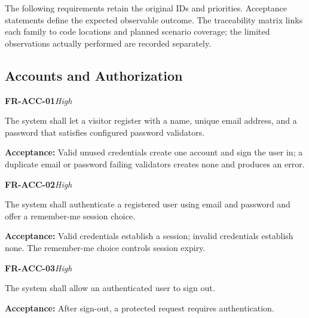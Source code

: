 \documentclass[12pt,a4paper,oneside]{report}
\begin{document}
The following requirements retain the original IDs and priorities. Acceptance statements define the expected observable outcome. The traceability matrix links each family to code locations and planned scenario coverage; the limited observations actually performed are recorded separately.


\subsection{Accounts and Authorization}

\noindent\begin{minipage}{\linewidth}\textbf{FR-ACC-01}\hfill\textit{High}\par\nopagebreak

The system shall let a visitor register with a name, unique email address, and a password that satisfies configured password validators.

{\color{muted}\textbf{Acceptance:} Valid unused credentials create one account and sign the user in; a duplicate email or password failing validators creates none and produces an error.\par}\end{minipage}\par\vspace{5pt}

\noindent\begin{minipage}{\linewidth}\textbf{FR-ACC-02}\hfill\textit{High}\par\nopagebreak

The system shall authenticate a registered user using email and password and offer a remember-me session choice.

{\color{muted}\textbf{Acceptance:} Valid credentials establish a session; invalid credentials establish none. The remember-me choice controls session expiry.\par}\end{minipage}\par\vspace{5pt}

\noindent\begin{minipage}{\linewidth}\textbf{FR-ACC-03}\hfill\textit{High}\par\nopagebreak

The system shall allow an authenticated user to sign out.

{\color{muted}\textbf{Acceptance:} After sign-out, a protected request requires authentication.\par}\end{minipage}\par\vspace{5pt}
\end{document}
